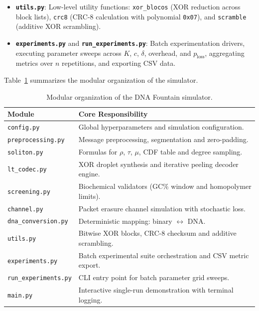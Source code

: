 \begin{itemize}
    \item \textbf{\texttt{utils.py}}: Low-level utility functions: \texttt{xor\_blocos} (XOR reduction across block lists), \texttt{crc8} (CRC-8 calculation with polynomial \texttt{0x07}), and \texttt{scramble} (additive XOR scrambling).

    \item \textbf{\texttt{experiments.py}} and \textbf{\texttt{run\_experiments.py}}: Batch experimentation drivers, executing parameter sweeps across $K$, $c$, $\delta$, overhead, and $p_{\text{loss}}$, aggregating metrics over $n$ repetitions, and exporting CSV data.
\end{itemize}

Table~\ref{tab:modulos_sistema} summarizes the modular organization of the simulator.

\begin{table}[htbp]
    \centering
    \small
    \caption{Modular organization of the DNA Fountain simulator.}
    \label{tab:modulos_sistema}
    \begin{tabular}{lp{10cm}}
        \toprule
        \textbf{Module} & \textbf{Core Responsibility} \\
        \midrule
        \texttt{config.py} & Global hyperparameters and simulation configuration. \\
        \texttt{preprocessing.py} & Message preprocessing, segmentation and zero-padding. \\
        \texttt{soliton.py} & Formulas for $\rho$, $\tau$, $\mu$, CDF table and degree sampling. \\
        \texttt{lt\_codec.py} & XOR droplet synthesis and iterative peeling decoder engine. \\
        \texttt{screening.py} & Biochemical validators (GC\% window and homopolymer limits). \\
        \texttt{channel.py} & Packet erasure channel simulation with stochastic loss. \\
        \texttt{dna\_conversion.py} & Deterministic mapping: binary $\leftrightarrow$ DNA. \\
        \texttt{utils.py} & Bitwise XOR blocks, CRC-8 checksum and additive scrambling. \\
        \texttt{experiments.py} & Batch experimental suite orchestration and CSV metric export. \\
        \texttt{run\_experiments.py} & CLI entry point for batch parameter grid sweeps. \\
        \texttt{main.py} & Interactive single-run demonstration with terminal logging. \\
        \bottomrule
    \end{tabular}
\end{table}

